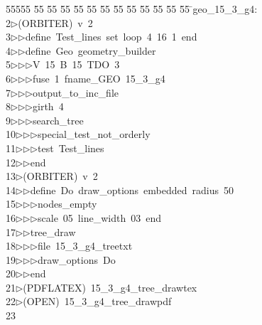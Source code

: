 %
%
\begin{tabbing}
55555 \= 55 \= 55 \= 55 \= 55 \= 55 \= 55 \= 55 \= 55 \= 55 \= 55 \= 55 \= 55 \= \>geo\_15\_3\_g4:\\[0pt]
2\>$\triangleright$\>(ORBITER)\ v\ 2\ \\[0pt]
3\>$\triangleright$\>$\triangleright$\>define\ Test\_lines\ set\ loop\ 4\ 16\ 1\ end\ \\[0pt]
4\>$\triangleright$\>$\triangleright$\>define\ Geo\ geometry\_builder\ \\[0pt]
5\>$\triangleright$\>$\triangleright$\>$\triangleright$\>V\ 15\ B\ 15\ TDO\ 3\ \\[0pt]
6\>$\triangleright$\>$\triangleright$\>$\triangleright$\>fuse\ 1\ fname\_GEO\ 15\_3\_g4\ \\[0pt]
7\>$\triangleright$\>$\triangleright$\>$\triangleright$\>output\_to\_inc\_file\ \\[0pt]
8\>$\triangleright$\>$\triangleright$\>$\triangleright$\>girth\ 4\ \\[0pt]
9\>$\triangleright$\>$\triangleright$\>$\triangleright$\>search\_tree\ \\[0pt]
10\>$\triangleright$\>$\triangleright$\>$\triangleright$\>special\_test\_not\_orderly\ \\[0pt]
11\>$\triangleright$\>$\triangleright$\>$\triangleright$\>test\ Test\_lines\ \\[0pt]
12\>$\triangleright$\>$\triangleright$\>end\\[0pt]
13\>$\triangleright$\>(ORBITER)\ v\ 2\ \\[0pt]
14\>$\triangleright$\>$\triangleright$\>define\ Do\ draw\_options\ embedded\ radius\ 50\ \\[0pt]
15\>$\triangleright$\>$\triangleright$\>$\triangleright$\>nodes\_empty\ \\[0pt]
16\>$\triangleright$\>$\triangleright$\>$\triangleright$\>scale\ 05\ line\_width\ 03\ end\ \\[0pt]
17\>$\triangleright$\>$\triangleright$\>tree\_draw\ \\[0pt]
18\>$\triangleright$\>$\triangleright$\>$\triangleright$\>file\ 15\_3\_g4\_treetxt\ \\[0pt]
19\>$\triangleright$\>$\triangleright$\>$\triangleright$\>draw\_options\ Do\ \\[0pt]
20\>$\triangleright$\>$\triangleright$\>end\\[0pt]
21\>$\triangleright$\>(PDFLATEX)\ 15\_3\_g4\_tree\_drawtex\\[0pt]
22\>$\triangleright$\>(OPEN)\ 15\_3\_g4\_tree\_drawpdf\\[0pt]
23\>\end{tabbing}
